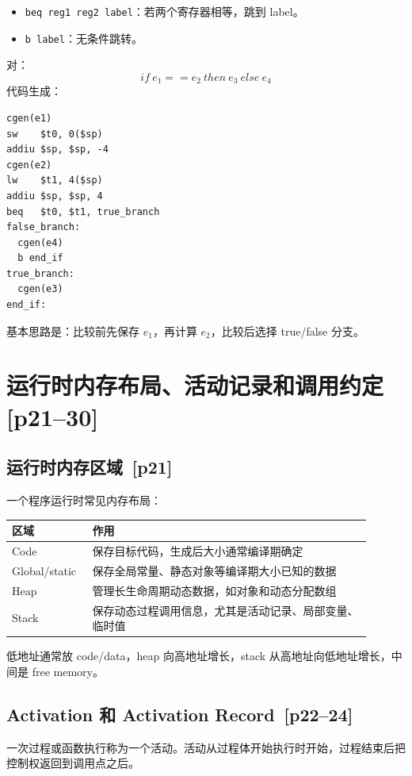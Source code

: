 \documentclass[UTF8,fontset=none,11pt]{ctexart}
\newenvironment{defbox}[1][]{%
  \par\medskip\noindent{\color{defrule}\rule{\linewidth}{1.1pt}}\par\nopagebreak
  \noindent{\bfseries\color{defrule}#1}\par\nopagebreak\smallskip}%
  {\par\nopagebreak\smallskip\noindent{\color{defrule}\rule{\linewidth}{0.4pt}}\par\medskip}
\newcommand{\pg}[1]{\texorpdfstring{{\small\color{graytext}\,[p#1]}}{ [p#1]}}
\begin{document}
\begin{itemize}
  \item \texttt{beq reg1 reg2 label}：若两个寄存器相等，跳到 label。
  \item \texttt{b label}：无条件跳转。
\end{itemize}

对：
\[
if\ e_1==e_2\ then\ e_3\ else\ e_4
\]
代码生成：

\begin{verbatim}
cgen(e1)
sw    $t0, 0($sp)
addiu $sp, $sp, -4
cgen(e2)
lw    $t1, 4($sp)
addiu $sp, $sp, 4
beq   $t0, $t1, true_branch
false_branch:
  cgen(e4)
  b end_if
true_branch:
  cgen(e3)
end_if:
\end{verbatim}

基本思路是：比较前先保存 \(e_1\)，再计算 \(e_2\)，比较后选择 true/false 分支。

\section{运行时内存布局、活动记录和调用约定 \pg{21--30}}

\subsection{运行时内存区域 \pg{21}}

一个程序运行时常见内存布局：

\begin{longtable}{L{0.18\linewidth}L{0.72\linewidth}}
\toprule
区域 & 作用 \\
\midrule
Code & 保存目标代码，生成后大小通常编译期确定 \\
Global/static & 保存全局常量、静态对象等编译期大小已知的数据 \\
Heap & 管理长生命周期动态数据，如对象和动态分配数组 \\
Stack & 保存动态过程调用信息，尤其是活动记录、局部变量、临时值 \\
\bottomrule
\end{longtable}

低地址通常放 code/data，heap 向高地址增长，stack 从高地址向低地址增长，中间是 free memory。

\subsection{Activation 和 Activation Record \pg{22--24}}

\begin{defbox}[Activation]
一次过程或函数执行称为一个活动。活动从过程体开始执行时开始，过程结束后把控制权返回到调用点之后。
\end{defbox}
\end{document}
